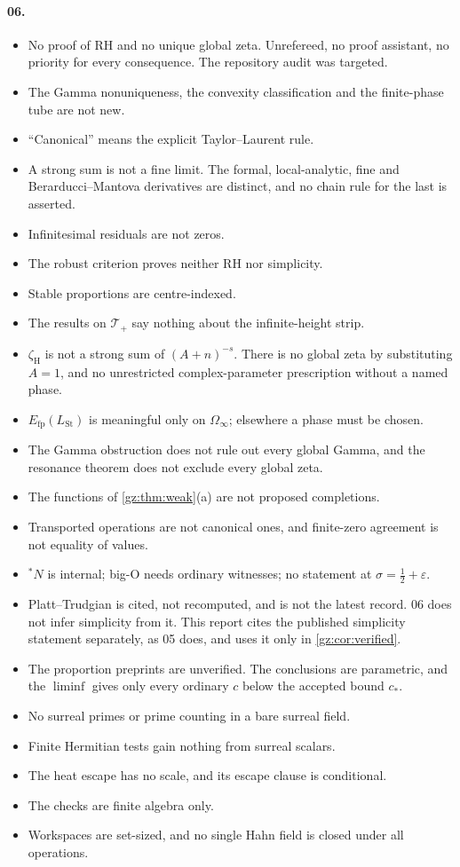 \documentclass[11pt,a4paper]{article}
\numberwithin{equation}{section}
\theoremstyle{definition}
\theoremstyle{remark}
\newcommand{\eps}{\varepsilon}
\newcommand{\Efp}{E_{\mathrm{fp}}}
\newcommand{\LSt}{L_{\mathrm{St}}}
\newcommand{\zH}{\zeta_{\mathrm H}}
\newcommand{\Tp}{\mathcal T_{+}}
\newcommand{\Om}{\Omega_{\infty}}
\newcommand{\bigO}{\mathrm{O}}
\begin{document}
\paragraph{06.}
\begin{itemize}
\item No proof of RH and no unique global zeta. Unrefereed, no proof assistant,
 no priority for every consequence. The repository audit was targeted.
\item The Gamma nonuniqueness, the convexity classification and the finite-phase
 tube are not new.
\item ``Canonical'' means the explicit Taylor--Laurent rule.
\item A strong sum is not a fine limit. The formal, local-analytic, fine and
 Berarducci--Mantova derivatives are distinct, and no chain rule for the last
 is asserted.
\item Infinitesimal residuals are not zeros.
\item The robust criterion proves neither RH nor simplicity.
\item Stable proportions are centre-indexed.
\item The results on $\Tp$ say nothing about the infinite-height strip.
\item $\zH$ is not a strong sum of $(A+n)^{-s}$. There is no global zeta by
 substituting $A=1$, and no unrestricted complex-parameter prescription
 without a named phase.
\item $\Efp(\LSt)$ is meaningful only on $\Om$; elsewhere a phase must be chosen.
\item The Gamma obstruction does not rule out every global Gamma, and the
 resonance theorem does not exclude every global zeta.
\item The functions of \cref{gz:thm:weak}(a) are not proposed completions.
\item Transported operations are not canonical ones, and finite-zero agreement
 is not equality of values.
\item ${}^*N$ is internal; big-$\bigO$ needs ordinary witnesses; no statement at
 $\sigma=\tfrac12+\eps$.
\item Platt--Trudgian is cited, not recomputed, and is not the latest record.
 06 does not infer simplicity from it. This report cites the published
 simplicity statement separately, as 05 does, and uses it only in
 \cref{gz:cor:verified}.
\item The proportion preprints are unverified. The conclusions are parametric,
 and the $\liminf$ gives only every ordinary $c$ below the accepted bound
 $c_*$.
\item No surreal primes or prime counting in a bare surreal field.
\item Finite Hermitian tests gain nothing from surreal scalars.
\item The heat escape has no scale, and its escape clause is conditional.
\item The checks are finite algebra only.
\item Workspaces are set-sized, and no single Hahn field is closed under all
 operations.
\end{itemize}
\end{document}
